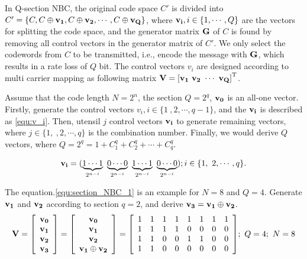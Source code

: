 In Q-section NBC, the original code space $C'$ is divided into $C'=\{C, C \oplus {\bf{v_1}}, C \oplus {\bf{v_2}}, \cdots, C \oplus {\bf{v_Q}} \}$, where ${\bf{v_i}}, i \in \{ 1, \cdots, Q \}$ are the vectors for splitting the code space, and the generator matrix $\bf G$ of $C$ is found by removing all control vectors in the generator matrix of $C'$. We only select the codewords from $C$ to be transmitted, i.e., encode the message with $\bf G$, which results in a rate loss of $Q$ bit. The control vectors $v_i$ are designed according to multi carrier mapping as following matrix ${\bf V} = {[{\bf{v_1}} \ {\bf{v_2}} \ \cdots \ {\bf{v_Q}}]}^{\text{T}}$.

Assume that the code length $N=2^n$, the section $Q=2^q$, ${\bf{v_0}}$ is an all-one vector. Firstly, generate the control vectors $v_i, i \in \{ 1 \ , 2 , \cdots , q-1 \}$, and the ${\bf{v_i}}$ is described as \ref{equ:v_i}. Then, utensil $j$ control vectors ${\bf{v_i}}$ to generate remaining vectors, where $j \in \{  1, \ , 2 , \cdots , q \}$ is the combination number. Finally, we would derive $Q$ vectors, where $Q=2^q=1+C^q_1+C^q_2+\cdots+C^q_q$.




\begin{align}
{\bf{v_i}} = {( \underbrace{1 \cdots 1}_{2^{n-i}} \ \underbrace{0 \cdots 0}_{2^{n-i}} \ \underbrace{1 \cdots 1}_{2^{n-i}} \ \underbrace{0 \cdots 0}_{2^{n-i}})}; i \in \{ 1, \ 2, \cdots , q  \}.
\label{equ:v_i}
\end{align}

The equation.\ref{equ:section_NBC_1} is an example for $N=8$ and $Q=4$. Generate ${\bf{v_1}}$ and ${\bf{v_2}}$ according to section $q=2$, and derive ${\bf{v_3}}={\bf{v_1}} \oplus {\bf{v_2}}$.  
\begin{equation}
{\bf V}= {
\left[ \begin{array}{ccc}
{\bf{v_0}} \\
{\bf{v_1}} \\
{\bf{v_2}} \\
{\bf{v_3}}
\end{array} 
\right ]}= {
\left[ \begin{array}{ccc} 
\bf v_0 \\
\bf  v_1 \\
\bf  v_2 \\
\bf  v_1 \oplus v_2
\end{array} 
\right ]} 
= {
\left[ \begin{array}{cccccccc}
1 & 1 & 1 & 1 & 1 & 1 & 1 & 1\\
1 & 1 & 1 & 1 & 0 & 0 & 0 & 0\\
1 & 1 & 0 & 0 & 1 & 1 & 0 & 0\\
1 & 1 & 0 & 0 & 0 & 0 & 0 & 0
\end{array}
\right ]}; \ Q=4; \ N=8
\label{equ:section_NBC_1}
\end{equation}


